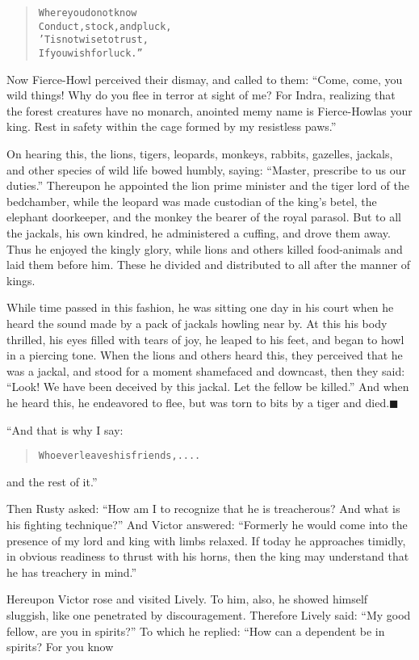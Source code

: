 \documentclass[article, twoside, 14pt]{memoir}
\newcommand{\qed}{\hfill \ensuremath{\blacksquare}}
\renewenvironment{verbatim}{%
\begin{quote}%
\vskip -10pt%
\begin{alltt}\normalfont\large}{\end{alltt}%
\end{quote}%
\vskip -10pt
} %
\begin{document}
\begin{verbatim}
Where you do not know
    Conduct, stock, and pluck,
'Tis not wise to trust,
    If you wish for luck.”
\end{verbatim}
Now Fierce-Howl perceived their dismay, and called to them:
``Come, come, you wild things! Why do you flee in terror at sight of me? For Indra, realizing that the forest creatures have no monarch, anointed me{\textemdash}my name is Fierce-Howl{\textemdash}as your king. Rest in safety within the cage formed by my resistless paws.''

On hearing this, the lions, tigers, leopards, monkeys, rabbits,
gazelles, jackals, and other species of wild life bowed humbly,
saying: ``Master, prescribe to us our duties.'' Thereupon he
appointed the lion prime minister and the tiger lord of the
bedchamber, while the leopard was made custodian of the king's
betel, the elephant doorkeeper, and the monkey the bearer of the
royal parasol. But to all the jackals, his own kindred, he
administered a cuffing, and drove them away. Thus he enjoyed the
kingly glory, while lions and others killed food-animals and laid
them before him. These he divided and distributed to all after the
manner of kings.

While time passed in this fashion, he was sitting one day in his
court when he heard the sound made by a pack of jackals howling
near by. At this his body thrilled, his eyes filled with tears of
joy, he leaped to his feet, and began to howl in a piercing tone.
When the lions and others heard this, they perceived that he was a
jackal, and stood for a moment shamefaced and downcast, then they
said:
``Look! We have been deceived by this jackal. Let the fellow be killed.''
And when he heard this, he endeavored to flee, but was torn to bits
by a tiger and died.\hyperref[s14]{\qed}

“And that is why I say:

\begin{verbatim}
Whoever leaves his friends, ....
\end{verbatim}
and the rest of it.”

Then Rusty asked:
``How am I to recognize that he is treacherous? And what is his fighting technique?''
And Victor answered:
``Formerly he would come into the presence of my lord and king with limbs relaxed. If today he approaches timidly, in obvious readiness to thrust with his horns, then the king may understand that he has treachery in mind.''

Hereupon Victor rose and visited Lively. To him, also, he showed
himself sluggish, like one penetrated by discouragement. Therefore
Lively said: ``My good fellow, are you in spirits?'' To which he
replied: “How can a dependent be in spirits? For you know
\end{document}
